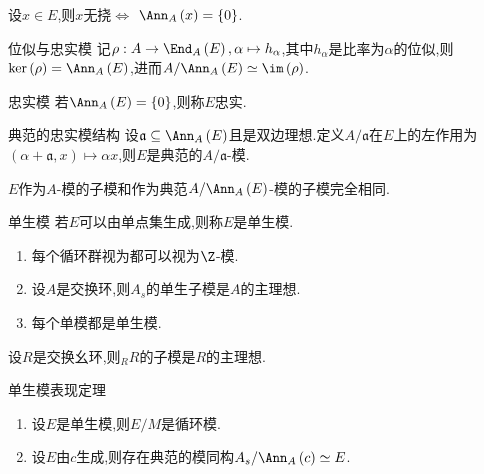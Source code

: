 \begin{proposition}{}{}
	设$x\in E$,则$x$无挠$\iff$ $\Ann_{A}\left(x\right)=\left\{0\right\}$.
\end{proposition}

\begin{proposition}{位似与忠实模}{}
	记$\rho:A\to\End_{A}\left(E\right),\alpha\mapsto h_{\alpha}$,其中$h_{\alpha}$是比率为$\alpha$的位似,则$\ker\left(\rho\right)=\Ann_{A}\left(E\right)$,进而$A/\Ann_{A}\left(E\right)\simeq\im\left(\rho\right)$.
\end{proposition}

\begin{definition}{忠实模}{}
	若$\Ann_{A}\left(E\right)=\left\{0\right\}$,则称$E$忠实.
\end{definition}

\begin{proposition}{典范的忠实模结构}{}
	设$\mathfrak{a}\subseteq\Ann_{A}\left(E\right)$且是双边理想.定义$A/\mathfrak{a}$在$E$上的左作用为$\left(\alpha+\mathfrak{a},x\right)\mapsto\alpha x$,则$E$是典范的$A/\mathfrak{a}$-模.
\end{proposition}

\begin{corollary}{}{}
	$E$作为$A$-模的子模和作为典范$A/\Ann_{A}\left(E\right)$-模的子模完全相同.
\end{corollary}

\begin{definition}{单生模}{}
	若$E$可以由单点集生成,则称$E$是单生模.
\end{definition}

\begin{example}{}{}
	\begin{enumerate}
		\item 每个循环群视为都可以视为$\Z$-模.
		\item 设$A$是交换环,则$A_{s}$的单生子模是$A$的主理想.
		\item 每个单模都是单生模.
	\end{enumerate}
\end{example}

\begin{proposition}{}{}
	设$R$是交换幺环,则$_{R}R$的子模是$R$的主理想.
\end{proposition}

\begin{proposition}{单生模表现定理}{}
	\begin{enumerate}
		\item 设$E$是单生模,则$E/M$是循环模.
		\item 设$E$由$c$生成,则存在典范的模同构$A_{s}/\Ann_{A}\left(c\right)\simeq E$.
	\end{enumerate}
\end{proposition}

